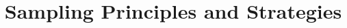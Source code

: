 \documentclass{beamer}
\title[MA205 - Section 1.3]{Sampling Principles and Strategies}
\begin{document}
\begin{frame}
\titlepage
\end{frame}
\end{document}
